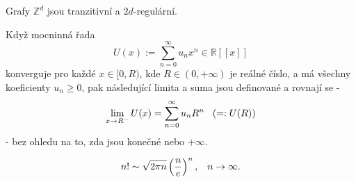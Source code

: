 \documentclass[../main.tex]{subfiles}
\begin{document}
\begin{lemma}
    Grafy $\mathbb{Z}^d$ jsou tranzitivní a $2d$-regulární.
\end{lemma}

\begin{theorem}
    Když mocninná řada
    \[ U(x) := \sum_{n=0}^{\infty} u_nx^n \in \mathbb{R}[[x]] \]
    konverguje pro každé $x \in [0,R)$, kde $R \in (0, +\infty)$
    je reálné číslo, a má všechny koeficienty $u_n \geq 0$,
    pak následující limita a suma jsou definované a rovnají se -
    \[ \lim_{x\to R^-} U(x) = \sum_{n=0}^{\infty} u_nR^n \hspace{3mm} (=: U(R)) \]
    - bez ohledu na to, zda jsou konečné nebo $+\infty$.
\end{theorem}

\begin{theorem}
    \[ n! \sim \sqrt{2\pi n} \left( \frac{n}{e} \right)^n, \hspace{3mm} n\to \infty. \]
\end{theorem}
\end{document}

